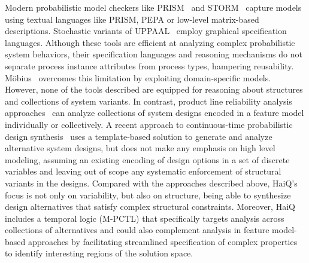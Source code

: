 \documentclass[10pt,journal,compsoc]{IEEEtran}
\begin{document}
\smallskip
{} Modern probabilistic model checkers like PRISM~\cite{DBLP:conf/cav/KwiatkowskaNP11} and STORM~\cite{DBLP:journals/corr/DehnertJK017} capture models using textual languages like PRISM, PEPA or low-level matrix-based descriptions. 
Stochastic variants of UPPAAL~\cite{stratego} employ graphical specification languages. 
Although these tools are efficient at analyzing complex probabilistic system behaviors, their specification languages and reasoning mechanisms do not separate process instance attributes from process types, hampering reusability. M\"obius~\cite{DBLP:conf/dsn/CourtneyGKRS09} overcomes this limitation by exploiting domain-specific models. 
However, none of the tools described are equipped for reasoning about structures and collections of system variants. In contrast, product line reliability analysis approaches~\cite{DBLP:journals/infsof/GhezziS13, Chrszon2017, DBLP:journals/scp/CastroLATAS18,DBLP:journals/infsof/LannaCARSA18} can analyze collections of system designs encoded in a feature model individually or collectively. 
A recent approach to continuous-time probabilistic design synthesis~\cite{DBLP:conf/icsa/CalinescuCGKP17} uses a template-based solution to generate and analyze alternative system designs, but does not make any emphasis on high level modeling, assuming an existing encoding of design options in a set of discrete variables and leaving out of scope any systematic enforcement of structural variants in the designs.
Compared with the approaches described above, {\sf HaiQ}'s focus is not only on variability, but also on structure, being able to synthesize design alternatives that satisfy complex structural constraints. Moreover, {\sf HaiQ} includes a temporal logic (M-PCTL) that specifically targets analysis across collections of alternatives and could also complement analysis in feature model-based approaches by facilitating streamlined specification of complex properties to identify interesting regions of the solution space.
\end{document}
